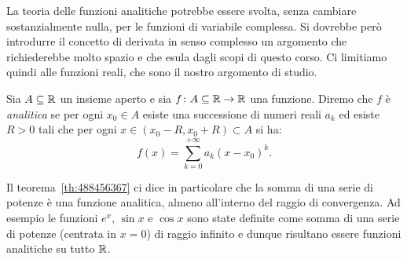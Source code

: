 La teoria delle funzioni analitiche potrebbe essere svolta, senza cambiare
sostanzialmente nulla, per le funzioni di variabile complessa.
Si dovrebbe però introdurre il concetto di derivata in senso complesso
un argomento che richiederebbe molto spazio e che esula dagli scopi di questo corso.
Ci limitiamo quindi alle funzioni reali, che sono il nostro argomento di studio.

\begin{definition}
%
Sia $A\subseteq {\mathbb R}$ un insieme aperto e sia
$f\colon A\subseteq {\mathbb R} \to {\mathbb R}$ una funzione. Diremo che
$f$ è \emph{analitica} se per ogni $x_0\in A$ esiste una successione
di numeri reali $a_k$ ed esiste $R>0$ tali che per ogni $x\in (x_0-R,x_0+R)\subset A$
si ha:
\[
  f(x) = \sum_{k=0}^{+\infty} a_k (x-x_0)^k.
\]
\end{definition}

Il teorema~\ref{th:488456367} ci dice in particolare che la somma di una serie
di potenze è una funzione analitica, almeno all'interno del raggio di convergenza.
Ad esempio le funzioni $e^x$, $\sin x$ e $\cos x$ sono state definite
come somma di una serie di potenze (centrata in $x=0$) di raggio infinito
e dunque risultano essere funzioni analitiche su tutto ${\mathbb R}$.

